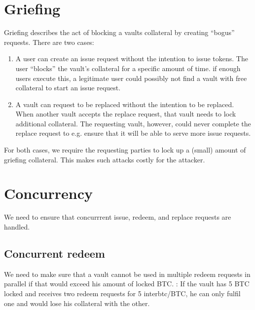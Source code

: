 \documentclass[a4paper,10pt,english]{sphinxmanual}
\begin{document}
\section{Griefing}
\label{\detokenize{security_performance/security-analysis:griefing}}\label{\detokenize{security_performance/security-analysis:id3}}
Griefing describes the act of blocking a vaults collateral by creating “bogus” requests. There are two cases:
\begin{enumerate}
%
\item {} 
A user can create an issue request without the intention to issue tokens. The user “blocks” the vault’s collateral for a specific amount of time. if enough users execute this, a legitimate user could possibly not find a vault with free collateral to start an issue request.

\item {} 
A vault can request to be replaced without the intention to be replaced. When another vault accepts the replace request, that vault needs to lock additional collateral. The requesting vault, however, could never complete the replace request to e.g. ensure that it will be able to serve more issue requests.

\end{enumerate}

For both cases, we require the requesting parties to lock up a (small) amount of griefing collateral. This makes such attacks costly for the attacker.


\section{Concurrency}
\label{\detokenize{security_performance/security-analysis:concurrency}}
We need to ensure that concurrrent issue, redeem, and replace requests are handled.


\subsection{Concurrent redeem}
\label{\detokenize{security_performance/security-analysis:concurrent-redeem}}
We need to make sure that a vault cannot be used in multiple redeem requests in parallel if that would exceed his amount of locked BTC. : If the vault has 5 BTC locked and receives two redeem requests for 5 interbtc/BTC, he can only fulfil one and would lose his collateral with the other.
\end{document}
